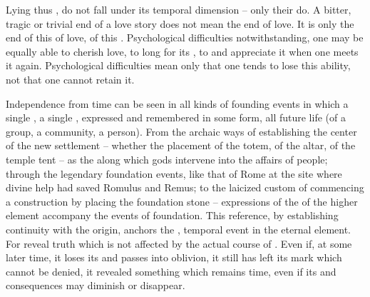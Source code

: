 
\pa 
Lying thus ,  do not fall under its temporal
dimension -- only their  do.  A bitter, tragic or trivial end
of a love story does not mean the end of love.  It is only the end of this
 of love, of this .  Psychological difficulties
notwithstanding, one may be equally able to cherish love, to long
for its , to  and appreciate it when one meets
it again. Psychological difficulties mean only that one tends to lose this
ability, not that one cannot retain it. 

Independence from time can be seen in all kinds of founding events in which a
single , a single , expressed and
remembered in some  form,  all future life (of a
group, a community, a person).  From the archaic ways of establishing the center
of the new settlement -- whether the placement of the totem, of the altar, of
the temple tent -- as the  along which gods intervene into the
affairs of people; through the legendary foundation events, like that of Rome at
the site where divine help had saved Romulus and Remus; to the laicized custom
of commencing a construction by placing the foundation stone --  expressions of the  of the higher element
accompany the events of foundation. This  reference, by
establishing continuity with the origin, anchors the , temporal event
in the eternal element.  For  reveal truth which is not
affected by the actual course of .  Even if, at some later time,
it loses its  and passes into oblivion, it still has left its mark
which cannot be denied, it revealed something which remains  time,
even if its  and  consequences may diminish or
disappear.

